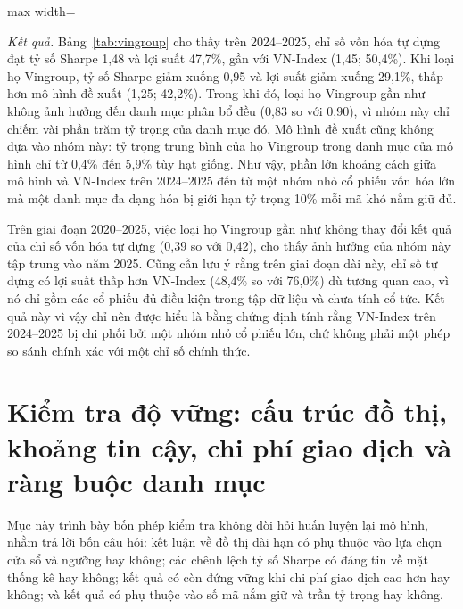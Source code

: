 \begin{table}[ht]
\centering\footnotesize
\setlength{\tabcolsep}{3.5pt}
\caption{Chỉ số vốn hóa có và không có họ Vingroup (VIC, VHM, VRE, VPL)}
\label{tab:vingroup}
\begin{adjustbox}{max width=\textwidth}\end{adjustbox}
\end{table}

\textit{Kết quả.} Bảng~\ref{tab:vingroup} cho thấy trên 2024--2025, chỉ số vốn hóa tự dựng đạt tỷ số Sharpe 1,48 và lợi suất 47,7\%, gần với VN-Index (1,45; 50,4\%). Khi loại họ Vingroup, tỷ số Sharpe giảm xuống 0,95 và lợi suất giảm xuống 29,1\%, thấp hơn mô hình đề xuất (1,25; 42,2\%). Trong khi đó, loại họ Vingroup gần như không ảnh hưởng đến danh mục phân bổ đều (0,83 so với 0,90), vì nhóm này chỉ chiếm vài phần trăm tỷ trọng của danh mục đó. Mô hình đề xuất cũng không dựa vào nhóm này: tỷ trọng trung bình của họ Vingroup trong danh mục của mô hình chỉ từ 0,4\% đến 5,9\% tùy hạt giống. Như vậy, phần lớn khoảng cách giữa mô hình và VN-Index trên 2024--2025 đến từ một nhóm nhỏ cổ phiếu vốn hóa lớn mà một danh mục đa dạng hóa bị giới hạn tỷ trọng 10\% mỗi mã khó nắm giữ đủ.

Trên giai đoạn 2020--2025, việc loại họ Vingroup gần như không thay đổi kết quả của chỉ số vốn hóa tự dựng (0,39 so với 0,42), cho thấy ảnh hưởng của nhóm này tập trung vào năm 2025. Cũng cần lưu ý rằng trên giai đoạn dài này, chỉ số tự dựng có lợi suất thấp hơn VN-Index (48,4\% so với 76,0\%) dù tương quan cao, vì nó chỉ gồm các cổ phiếu đủ điều kiện trong tập dữ liệu và chưa tính cổ tức. Kết quả này vì vậy chỉ nên được hiểu là bằng chứng định tính rằng VN-Index trên 2024--2025 bị chi phối bởi một nhóm nhỏ cổ phiếu lớn, chứ không phải một phép so sánh chính xác với một chỉ số chính thức.

\section{Kiểm tra độ vững: cấu trúc đồ thị, khoảng tin cậy, chi phí giao dịch và ràng buộc danh mục}
\label{sec:robust2}

Mục này trình bày bốn phép kiểm tra không đòi hỏi huấn luyện lại mô hình, nhằm trả lời bốn câu hỏi: kết luận về đồ thị dài hạn có phụ thuộc vào lựa chọn cửa sổ và ngưỡng hay không; các chênh lệch tỷ số Sharpe có đáng tin về mặt thống kê hay không; kết quả có còn đứng vững khi chi phí giao dịch cao hơn hay không; và kết quả có phụ thuộc vào số mã nắm giữ và trần tỷ trọng hay không.

